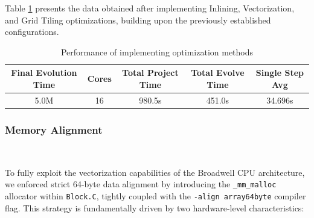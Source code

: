 Table \ref{tab:amss three methods} presents the data obtained after implementing Inlining, Vectorization, and Grid Tiling optimizations, building upon the previously established configurations.
\begin{table}[h]
    \centering
    \caption{Performance of implementing optimization methods}
    \label{tab:amss three methods}
    \small %
    \begin{tabular}{|c|c|c|c|c|}
        \hline
        \textbf{Final Evolution Time }& \textbf{Cores} & \textbf{Total Project Time} &\textbf{Total Evolve Time} & \textbf{Single Step Avg} \\ \hline
        5.0M & 16 & 980.5s & 451.0s& 34.696s \\ \hline
    \end{tabular}
\end{table}

\subsubsection{Memory Alignment}
\


To fully exploit the vectorization capabilities of the Broadwell CPU architecture, we enforced strict 64-byte data alignment by introducing the \texttt{\_mm\_malloc} allocator within \texttt{Block.C}, tightly coupled with the \texttt{-align array64byte} compiler flag. 
This strategy is fundamentally driven by two hardware-level characteristics:

